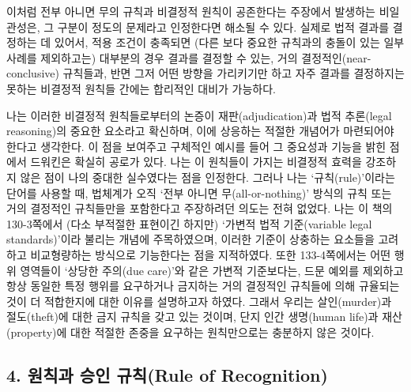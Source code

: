 이처럼 전부 아니면 무의 규칙과 비결정적 원칙이 공존한다는 주장에서
발생하는 비일관성은, 그 구분이 정도의 문제라고 인정한다면 해소될 수
있다. 실제로 법적 결과를 결정하는 데 있어서, 적용 조건이 충족되면 (다른
보다 중요한 규칙과의 충돌이 있는 일부 사례를 제외하고는) 대부분의 경우
결과를 결정할 수 있는, 거의 결정적인(near-conclusive) 규칙들과, 반면
그저 어떤 방향을 가리키기만 하고 자주 결과를 결정하지는 못하는 비결정적
원칙들 간에는 합리적인 대비가 가능하다.

나는 이러한 비결정적 원칙들로부터의 논증이 재판(adjudication)과 법적
추론(legal reasoning)의 중요한 요소라고 확신하며, 이에 상응하는 적절한
개념어가 마련되어야 한다고 생각한다. 이 점을 보여주고 구체적인 예시를
들어 그 중요성과 기능을 밝힌 점에서 드워킨은 확실히 공로가 있다. 나는 이
원칙들이 가지는 비결정적 효력을 강조하지 않은 점이 나의 중대한
실수였다는 점을 인정한다. 그러나 나는 `규칙(rule)'이라는 단어를 사용할
때, 법체계가 오직 `전부 아니면 무(all-or-nothing)' 방식의 규칙 또는 거의
결정적인 규칙들만을 포함한다고 주장하려던 의도는 전혀 없었다. 나는 이
책의 130-3쪽에서 (다소 부적절한 표현이긴 하지만) `가변적 법적
기준(variable legal standards)'이라 불리는 개념에 주목하였으며, 이러한
기준이 상충하는 요소들을 고려하고 비교형량하는 방식으로 기능한다는 점을
지적하였다. 또한 133-4쪽에서는 어떤 행위 영역들이 `상당한 주의(due
care)'와 같은 가변적 기준보다는, 드문 예외를 제외하고 항상 동일한 특정
행위를 요구하거나 금지하는 거의 결정적인 규칙들에 의해 규율되는 것이 더
적합한지에 대한 이유를 설명하고자 하였다. 그래서 우리는 살인(murder)과
절도(theft)에 대한 금지 규칙을 갖고 있는 것이며, 단지 인간 생명(human
life)과 재산(property)에 대한 적절한 존중을 요구하는 원칙만으로는
충분하지 않은 것이다.

\subsection{4. 원칙과 승인 규칙(Rule of
Recognition)}\label{uxc6d0uxce59uxacfc-uxc2b9uxc778-uxaddcuxce59rule-of-recognition}

\subsubsection{\texorpdfstring{}{형식적 기원(Pedigree)과 해석(Interpretation)}}\label{uxd615uxc2dduxc801-uxae30uxc6d0pedigreeuxacfc-uxd574uxc11dinterpretation}

